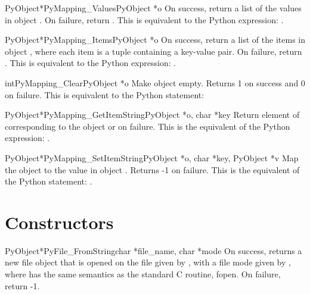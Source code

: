      \begin{cfuncdesc}{PyObject*}{PyMapping_Values}{PyObject *o}
         On success, return a list of the values in object .  On
	 failure, return {\NULL}. This is equivalent to the Python
	 expression: .
     \end{cfuncdesc}


     \begin{cfuncdesc}{PyObject*}{PyMapping_Items}{PyObject *o}
         On success, return a list of the items in object , where
	 each item is a tuple containing a key-value pair.  On
	 failure, return {\NULL}. This is equivalent to the Python
	 expression: .
     \end{cfuncdesc}

     \begin{cfuncdesc}{int}{PyMapping_Clear}{PyObject *o}
         Make object  empty.  Returns 1 on success and 0 on failure.
	 This is equivalent to the Python statement:
     \end{cfuncdesc}


     \begin{cfuncdesc}{PyObject*}{PyMapping_GetItemString}{PyObject *o, char *key}
	 Return element of  corresponding to the object  or {\NULL}
	 on failure. This is the equivalent of the Python expression:
	 .
     \end{cfuncdesc}

     \begin{cfuncdesc}{PyObject*}{PyMapping_SetItemString}{PyObject *o, char *key, PyObject *v}
         Map the object  to the value  in object .  Returns 
         -1 on failure.  This is the equivalent of the Python
         statement: .
     \end{cfuncdesc}


\section{Constructors}

     \begin{cfuncdesc}{PyObject*}{PyFile_FromString}{char *file_name, char *mode}
	 On success, returns a new file object that is opened on the
	 file given by , with a file mode given by ,
	 where  has the same semantics as the standard C routine,
	 fopen.  On failure, return -1.
     \end{cfuncdesc}
     
